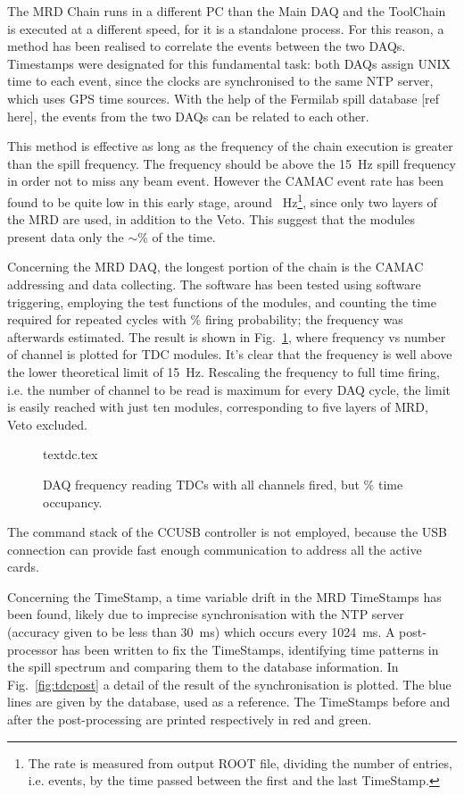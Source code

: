  The MRD Chain runs in a different PC than the Main DAQ and the ToolChain %
 is executed at a different speed, for it is a standalone process.
 For this reason, a method has been realised to correlate the events between the two DAQs.
 Timestamps were designated for this fundamental task: both DAQs assign UNIX time to each event, since %
 the clocks are synchronised to the same NTP server, which uses GPS time sources.
 With the help of the Fermilab spill database [ref here], the events from the two DAQs can be related %
 to each other.

 This method is effective as long as the frequency of the chain execution is greater than the %
 spill frequency.
 The frequency should be above the 15~Hz spill frequency in order not to miss any beam event.
 However the CAMAC event rate has been found to be quite low in this %
 early stage, around ~Hz\footnote{The rate is measured from output ROOT file, dividing %
   the number of entries, i.e. events, by the time passed between the first and the last TimeStamp.}, %
 since only two layers of the MRD are used, in addition to the Veto.
 This suggest that the modules present data only the $\sim$\% of the time.
 
 Concerning the MRD DAQ, the longest portion of the chain is the CAMAC addressing and data collecting.
 The software has been tested using software triggering, employing the test functions of the modules, %
 and counting the time required for  repeated cycles with \% firing probability; %
 the frequency was afterwards estimated.
 The result is shown in Fig.~\ref{fig:tdcfreq}, where frequency vs number of channel is %
 plotted for TDC modules.
 It's clear that the frequency is well above the lower theoretical limit of 15~Hz.
 Rescaling the frequency to full time firing, i.e. the number of channel to be read is maximum %
 for every DAQ cycle, the limit is easily reached with just ten modules, corresponding %
 to five layers of MRD, Veto excluded.
 
\begin{figure}
  \centering
  {textdc.tex}
    \caption{DAQ frequency reading TDCs with all channels fired, but \% time occupancy.}
  \label{fig:tdcfreq}
\end{figure}

 The command stack of the CCUSB controller is not employed, because the USB connection can provide %
 fast enough communication to address all the active cards.

 Concerning the TimeStamp, a time variable drift in the MRD TimeStamps has been found, %
 likely due to imprecise synchronisation with the NTP server %
 (accuracy given to be less than 30~ms) which occurs every 1024~ms. 
 A post-processor has been written to fix the TimeStamps, identifying time patterns in the %
 spill spectrum and comparing them to the database information.
 In Fig.~\ref{fig:tdcpost} a detail of the result of the synchronisation is plotted.
 The blue lines are given by the database, used as a reference.
 The TimeStamps before and after the post-processing are printed respectively in red and green.

